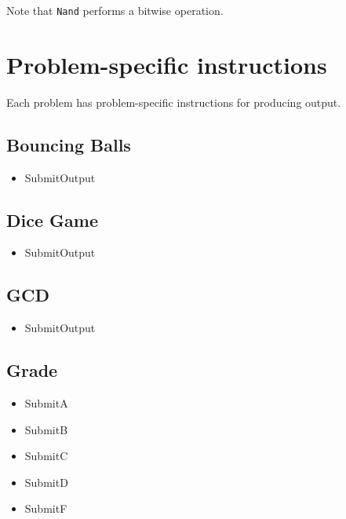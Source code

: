 \documentclass[
]{book}
\newcommand{\passthrough}[1]{#1}
\providecommand{\tightlist}{%
  \setlength{\itemsep}{0pt}\setlength{\parskip}{0pt}}
\begin{document}
Note that \passthrough{\lstinline!Nand!} performs a bitwise operation.

\hypertarget{problem-specific-instructions}{%
\section{Problem-specific instructions}\label{problem-specific-instructions}}

Each problem has problem-specific instructions for producing output.

\hypertarget{bouncing-balls}{%
\subsection{Bouncing Balls}\label{bouncing-balls}}

\begin{itemize}
\tightlist
\item
  SubmitOutput
\end{itemize}

\hypertarget{dice-game}{%
\subsection{Dice Game}\label{dice-game}}

\begin{itemize}
\tightlist
\item
  SubmitOutput
\end{itemize}

\hypertarget{gcd}{%
\subsection{GCD}\label{gcd}}

\begin{itemize}
\tightlist
\item
  SubmitOutput
\end{itemize}

\hypertarget{grade}{%
\subsection{Grade}\label{grade}}

\begin{itemize}
\tightlist
\item
  SubmitA
\item
  SubmitB
\item
  SubmitC
\item
  SubmitD
\item
  SubmitF
\end{itemize}
\end{document}
